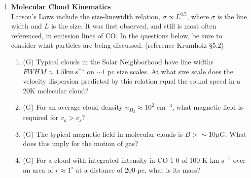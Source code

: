 \documentclass{article}
\begin{document}
\begin{enumerate}
\item \textbf{Molecular Cloud Kinematics} \\

    Larson's Laws include the size-linewidth relation, $\sigma \propto L^{0.5}$, where $\sigma$ is the line width and $L$ is the size.
    It was first observed, and still is most often referenced, in emission lines of CO.
    In the questions below, be sure to consider what particles are being discussed.
    (reference Krumholz \S 5.2)

    \begin{enumerate}
        \item (G) Typical clouds in the Solar Neighborhood have line widths $FWHM\approx 1.5 \mathrm{km~s}^{-1}$ on $\sim1$ pc size scales.
            At what size scale does the velocity dispersion predicted by this relation equal the sound speed in a 20K molecular cloud?
        \item (G) For an average cloud density $n_{H_2}\approx10^2$ cm$^{-3}$, what magnetic field is required for $v_{a} > c_s$?
        \item (G) The typical magnetic field in molecular clouds is $B>\sim10 \mu\mathrm{G}$.  What does this imply for the motion of gas?
        \item (G) For a cloud with integrated intensity in CO 1-0 of 100 K km s$^{-1}$ over an area of $r\approx1^{\circ}$
            at a distance of 200 pc, what is its mass?

    \end{enumerate}


\end{enumerate}




\end{document}
